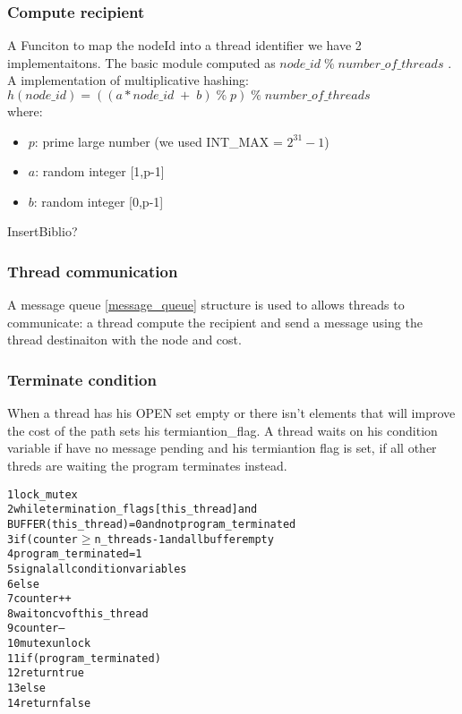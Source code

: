\subsubsection{Compute recipient}
\label{compute_reci}

A Funciton to map the nodeId into a thread identifier we have 2 implementaitons.
The basic module computed as  $node\_id \; \% \;  number\_of\_threads$ .
A implementation of multiplicative hashing: \\
$ h(node\_id) =((a*node\_id \; + \; b) \; \% \; p) \; \% \; number\_of\_threads $  \\ where:
\begin{itemize}
    \item $p$: prime large number (we used INT\_MAX =  $ 2^{31}-1 $)
    \item $a$: random integer [1,p-1]
    \item $b$: random integer [0,p-1]
\end{itemize}

InsertBiblio?

\subsubsection{Thread communication}
\label{thread_buf}

A message queue \ref{message_queue} structure is used to allows threads to communicate: a thread compute the recipient and send a message using the thread destinaiton with the node and cost.

\subsubsection{Terminate condition}
\label{terminate}

When a thread has his OPEN set empty or there isn't elements that will improve the cost of the path sets his termiantion\_flag. A thread waits on his condition variable if have no message pending and his termiantion flag is set, if all other threds are waiting the program terminates instead.

\begin{alltt}
    1 lock_mutex
    2 while termination_flags[this_thread] and
    BUFFER(this_thread) = 0 and not program_terminated
    3   if(counter \( \geq \) n_threads - 1 and all buffer empty
    4       program_terminated = 1
    5       signal all condition variables
    6   else
    7       counter++
    8       wait on cv of this_thread
    9       counter--
    10 mutex unlock
    11 if(program_terminated)
    12  return true
    13 else
    14  return false
\end{alltt}

